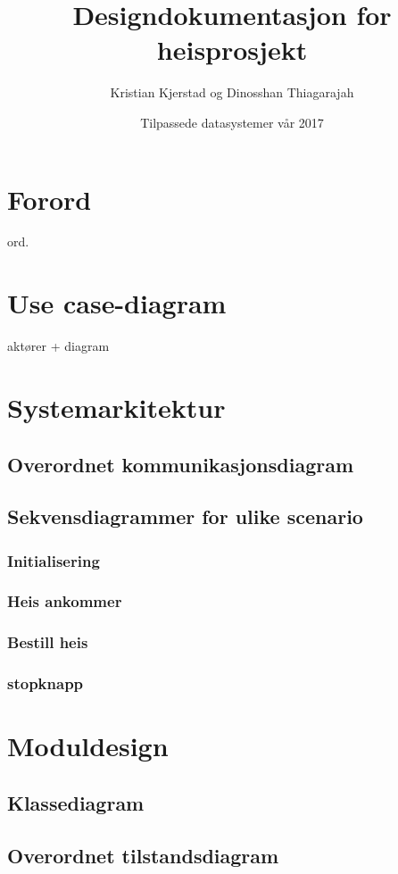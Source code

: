 \documentclass{article}
\title{\huge Designdokumentasjon for heisprosjekt}
\author{\large Kristian Kjerstad og Dinosshan Thiagarajah }
\date{\large Tilpassede datasystemer vår 2017}
\begin{document}
\begin{titlepage}
\maketitle
\end{titlepage}


\section{Forord}
ord.
\section{Use case-diagram}
aktører + diagram


\section{Systemarkitektur}
\subsection{Overordnet kommunikasjonsdiagram}
\subsection{Sekvensdiagrammer for ulike scenario}
\subsubsection{Initialisering}
\subsubsection{Heis ankommer}
\subsubsection{Bestill heis}
\subsubsection{stopknapp}


\section{Moduldesign}
\subsection{Klassediagram}
\subsection{Overordnet tilstandsdiagram}
\end{document}
